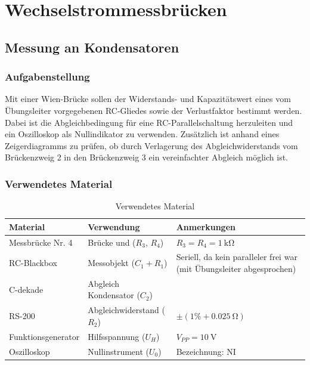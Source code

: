 \section{Wechselstrommessbrücken}\label{sec:2}
\subsection{Messung an Kondensatoren}\label{sec:2-1}
\subsubsection{Aufgabenstellung}

Mit einer Wien-Brücke sollen der Widerstands- und Kapazitätswert eines vom Übungsleiter vorgegebenen RC-Gliedes sowie der Verlustfaktor bestimmt werden. Dabei ist die Abgleichbedingung für eine RC-Parallelschaltung herzuleiten und ein Oszilloskop als Nullindikator zu verwenden. Zusätzlich ist anhand eines Zeigerdiagramms zu prüfen, ob durch Verlagerung des Abgleichwiderstands vom Brückenzweig 2 in den Brückenzweig 3 ein vereinfachter Abgleich möglich ist.

\subsubsection{Verwendetes Material}

\begin{table}[h]
	\centering
	\caption{Verwendetes Material}
	\begin{tabularx}{\textwidth}{XXX}
		\textbf{Material}  & \textbf{Verwendung}          & \textbf{Anmerkungen}                                                 \\ \midrule
		Messbrücke Nr. 4   & Brücke und ($R_3$, $R_4$)    & $R_3=R_4=\SI{1}{\kilo\ohm}$                                          \\
		RC-Blackbox        & Messobjekt ($C_1 + R_1$)     & Seriell, da kein paralleler frei war (mit Übungsleiter abgesprochen) \\
		C-dekade           & Abgleich Kondensator ($C_2$) &                                                                      \\
		RS-200             & Abgleichwiderstand ($R_2$)   & $\pm (1\% + \SI{0.025}{\ohm})$                                       \\
		Funktionsgenerator & Hilfsspannung ($U_H$)        & $V_{PP} = \SI{10}{\volt}$                                            \\
		Oszilloskop        & Nullinstrument ($U_0$)       & Bezeichnung: NI                                                      \\
	\end{tabularx}
\end{table}

